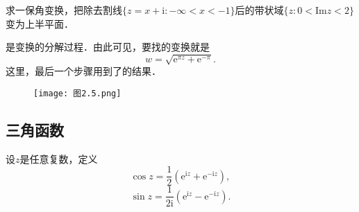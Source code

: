 \documentclass[../../main.tex]{subfiles}
\begin{document}
\begin{example}
求一保角变换，把除去割线$\{ z = x + \text{i}: -\infty < x < -1 \}$后的带状域$\{ z: 0 < \text{Im} z < 2 \}$变为上半平面．
\end{example}
\begin{solution}
是变换的分解过程．由此可见，要找的变换就是
\[
w = \sqrt{\text{e}^{\pi z} + \text{e}^{-\pi}}.
\]
这里，最后一个步骤用到了的结果．
\begin{figure}[H]
\centering
\texttt{[image: 图2.5.png]}
\caption{}
\label{figure:图2.5}
\end{figure}

\end{solution}



\subsection{三角函数}

\begin{definition}
设$z$是任意复数，定义
\[
\cos z = \dfrac{1}{2}(\text{e}^{\text{i}z} + \text{e}^{-\text{i}z}),
\]
\[
\sin z = \dfrac{1}{2\text{i}}(\text{e}^{\text{i}z} - \text{e}^{-\text{i}z}).
\]
\end{definition}
\end{document}
